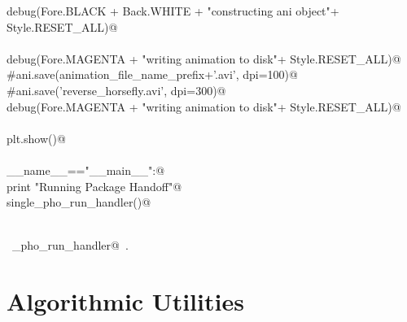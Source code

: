\documentclass[12.0pt]{report}
\begin{document}
\begin{appendices}
\begin{flushleft}
\begin{list}{}{}
\mbox{}\verb@    debug(Fore.BLACK + Back.WHITE + "\nFinished constructing ani object"+ Style.RESET_ALL)@\\
\mbox{}\verb@@\\
\mbox{}\verb@    debug(Fore.MAGENTA + "\nStarted writing animation to disk"+ Style.RESET_ALL)@\\
\mbox{}\verb@    #ani.save(animation_file_name_prefix+'.avi', dpi=100)@\\
\mbox{}\verb@    #ani.save('reverse_horsefly.avi', dpi=300)@\\
\mbox{}\verb@    debug(Fore.MAGENTA + "\nFinished writing animation to disk"+ Style.RESET_ALL)@\\
\mbox{}\verb@@\\
\mbox{}\verb@    plt.show()@\\
\mbox{}\verb@@\\
\mbox{}\verb@if __name__=="__main__":@\\
\mbox{}\verb@     print "Running Package Handoff"@\\
\mbox{}\verb@     single_pho_run_handler()@\\
\mbox{}\verb@@\\
\mbox{}\verb@@{\NWsep}
\end{list}
\vspace{-1.5ex}
\footnotesize
\begin{list}{}{\setlength{\itemsep}{-\parsep}\setlength{\itemindent}{-\leftmargin}}
\item \NWtxtIdentsUsed\nobreak\  \verb@single_pho_run_handler@\nobreak\ .
\item{}
\end{list}
\vspace{4ex}
\end{flushleft}


\section{Algorithmic Utilities}


\end{appendices}
\end{document}
